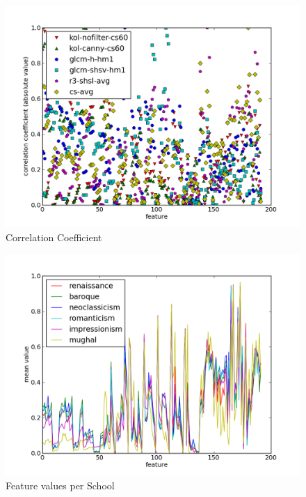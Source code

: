 \documentclass[11pt,a4paper,draft]{report}
\begin{document}
\begin{multicols}{2}
\begin{figure}[tbp]
\centering
\includegraphics[width=\textwidth]{corr-graph}
\caption[Correlation]{Correlation Coefficient}
\label{fig:corr}
\end{figure}

\begin{figure}[tbp]
\centering
\includegraphics[width=\textwidth]{school-graph}
\caption[Feature Values]{Feature values per School}
\label{fig:school}
\end{figure}


\end{multicols}
\end{document}
